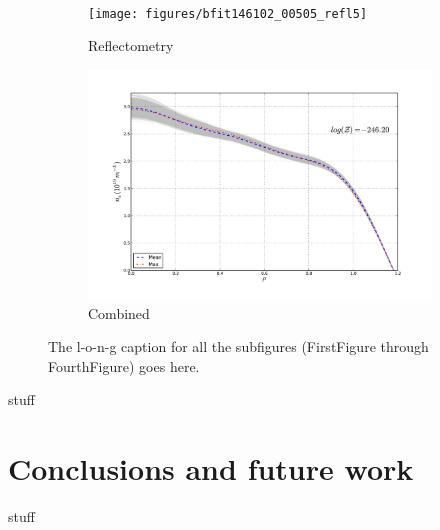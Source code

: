 \documentclass[12pt]{article}
\numberwithin{equation}{section}
\begin{document}
\begin{figure}[h]
\begin{subfigure}[b]{0.5\textwidth}
		\label{fig:inter505}
	\end{subfigure} \\%
	\begin{subfigure}[b]{0.5\textwidth}
		\centering
		\texttt{[image: figures/bfit146102\_00505\_refl5]}
		\vspace{-30pt}
		\caption{Reflectometry}
		\label{fig:refl505}
	\end{subfigure}
	\hspace{-20pt}
	\begin{subfigure}[b]{0.5\textwidth}
		\centering
		\includegraphics[width=\textwidth,keepaspectratio=true]{figures/bfit146102_00505_all5}
		\vspace{-30pt}
		\caption{Combined}
		\label{fig:all505}
	\end{subfigure}
	\caption{The l-o-n-g caption for all the subfigures (FirstFigure through FourthFigure) goes here.}
	\label{fig:dne505}
\end{figure}
stuff
\section{Conclusions and future work}
stuff
\newpage


\end{document}

